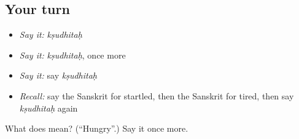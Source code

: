 \subsection*{Your turn}
\begin{itemize}
\raggedright
  \item \emph{Say it:} \emph{kṣudhitaḥ}
  \item \emph{Say it:} \emph{kṣudhitaḥ}, once more
  \item \emph{Say it:} say \emph{kṣudhitaḥ}
  \item \emph{Recall:} say the Sanskrit for startled, then the Sanskrit for tired, then say \emph{kṣudhitaḥ} again
\end{itemize}

\begin{tcolorbox}[breakable,colback=teal!4,colframe=teal!35!black,title={Before you move on}]
What does  mean? (\textquotedblleft{}Hungry\textquotedblright{}.) Say it once more.
\end{tcolorbox}
